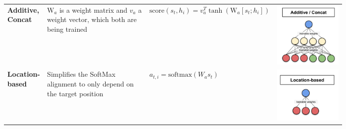 \documentclass[11pt]{article}
\begin{document}
\begin{tabularx}{\linewidth}{m{0.1\linewidth} m{0.3\linewidth} m{0.2\linewidth} m{0.2\linewidth}}
	\textbf{Additive, Concat} & $\text{W}_a$ is a weight matrix and $v_a $ a weight vector, which both are being trained \parencite{bahdanau2014neural} & $\text{score}(s_t,h_i) = v_a^T\tanh\left(\text{W}_a[s_t;h_i]\right) $ & \includegraphics[width=\linewidth]{img/attention_additive.png}\\
	\textbf{Location-based} & Simplifies the SoftMax alignment to only depend on the target position \parencite{luong2015effective} & $ a_{t,i} = \text{softmax}\left(W_a s_t\right) $ & \includegraphics[width=\linewidth]{img/attention_location.png}\\

\end{tabularx}
\end{document}
